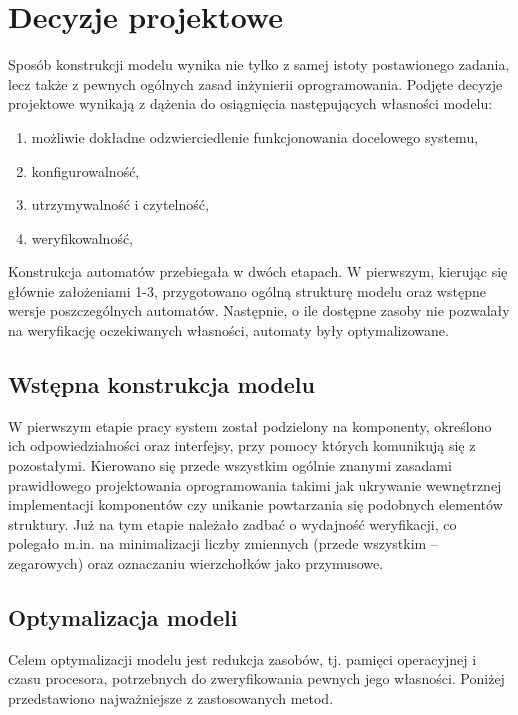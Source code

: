 \documentclass{pracamgr}
\theoremstyle{plain}
\begin{document}
\section{Decyzje projektowe}
\label{s:models:project}

Sposób konstrukcji modelu wynika nie tylko z samej istoty postawionego
zadania, lecz także z pewnych ogólnych zasad inżynierii
oprogramowania. Podjęte decyzje projektowe wynikają z dążenia do
osiągnięcia następujących własności modelu:
\begin{enumerate}
  \item możliwie dokładne odzwierciedlenie funkcjonowania docelowego systemu,
  \item konfigurowalność,
  \item utrzymywalność i czytelność,
  \item weryfikowalność,
\end{enumerate}
Konstrukcja automatów przebiegała w dwóch etapach. W pierwszym,
kierując się głównie założeniami 1-3, przygotowano ogólną strukturę
modelu oraz wstępne wersje poszczególnych automatów. Następnie, o ile
dostępne zasoby nie pozwalały na weryfikację oczekiwanych własności,
automaty były optymalizowane.

\subsection{Wstępna konstrukcja modelu}

W pierwszym etapie pracy system został podzielony na komponenty,
określono ich odpowiedzialności oraz interfejsy, przy pomocy których
komunikują się z pozostałymi. Kierowano się przede wszystkim ogólnie
znanymi zasadami prawidłowego projektowania oprogramowania takimi jak
ukrywanie wewnętrznej implementacji komponentów czy unikanie
powtarzania się podobnych elementów struktury. Już na tym etapie
należało zadbać o wydajność weryfikacji, co polegało m.in. na
minimalizacji liczby zmiennych (przede wszystkim -- zegarowych) oraz
oznaczaniu wierzchołków jako przymusowe.

\subsection{Optymalizacja modeli}
\label{s:models:opt}

Celem optymalizacji modelu jest redukcja zasobów, tj. pamięci
operacyjnej i czasu procesora, potrzebnych do zweryfikowania pewnych
jego własności. Poniżej przedstawiono najważniejsze z zastosowanych metod.
\end{document}
